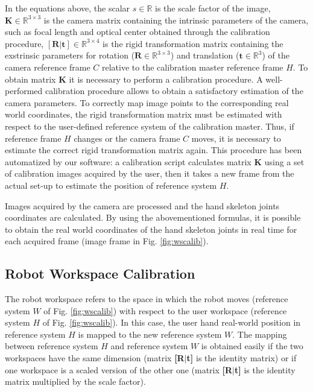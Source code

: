 \documentclass[a4paper, 10 pt, conference]{ieeeconf}      %
\begin{document}
In the equations above, the scalar $s\in\mathbb{R}$ is the scale factor of the image, $\mathbf{K}\in\mathbb{R}^{3\times3}$ is the camera matrix containing the intrinsic parameters of the camera, such as focal length and optical center obtained through the calibration procedure, $\mathbf{[R|t]}\in\mathbb{R}^{3\times4}$ is the rigid transformation matrix containing the exstrinsic parameters for rotation ($\mathbf{R}\in\mathbb{R}^{3\times3}$) and translation ($\mathbf{t}\in\mathbb{R}^3$) of the camera reference frame $C$ relative to the calibration master reference frame $H$. 
To obtain matrix \textbf{K} it is necessary to perform a calibration procedure. A well-performed calibration procedure allows to obtain a satisfactory estimation of the camera parameters. To correctly map image points to the corresponding real world coordinates, the rigid transformation matrix must be estimated with respect to the user-defined reference system of the calibration master. Thus, if reference frame $H$ changes or the camera frame $C$ moves, it is necessary to estimate the correct rigid transformation matrix again. This procedure has been automatized by our software: a calibration script calculates matrix \textbf{K} using a set of calibration images acquired by the user, then it takes a new frame from the actual set-up to estimate the position of reference system $H$.

Images acquired by the camera are processed and the hand skeleton joints coordinates are calculated. By using the abovementioned formulas, it is possible to obtain the real world coordinates of the hand skeleton joints in real time for each acquired frame (image frame in Fig. \ref{fig:wscalib}).


\subsection{Robot Workspace Calibration}

The robot workspace refers to the space in which the robot moves (reference system $W$ of Fig. \ref{fig:wscalib}) with respect to the user workspace (reference system $H$ of Fig. \ref{fig:wscalib}). In this case, the user hand real-world position in reference system $H$ is mapped to the new reference system $W$. The mapping between reference system $H$ and reference system $W$ is obtained easily if the two workspaces have the same dimension (matrix \textbf{[R$|$t]} is the identity matrix) or if one workspace is a scaled version of the other one (matrix \textbf{[R$|$t]} is the identity matrix multiplied by the scale factor). %
\end{document}
